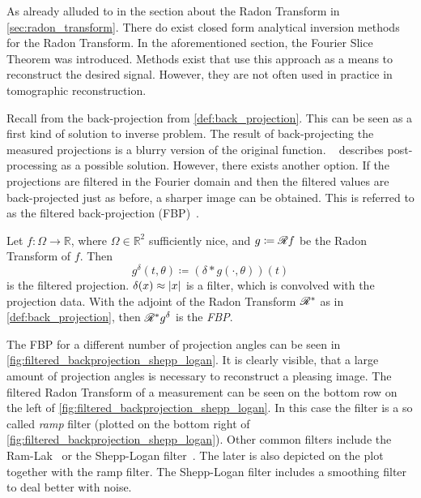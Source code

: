 As already alluded to in the section about the Radon Transform in \autoref{sec:radon_transform}.
There do exist closed form analytical inversion methods for the Radon Transform. In the
aforementioned section, the Fourier Slice Theorem was introduced. Methods exist that use this
approach as a means to reconstruct the desired signal. However, they are not often used in practice
in tomographic reconstruction.

Recall from the back-projection from \autoref{def:back_projection}. This can be seen as a first kind
of solution to inverse problem. The result of back-projecting the measured projections is a blurry
version of the original function. \citeauthor{buzug_computed_2008}~\cite{buzug_computed_2008}
describes post-processing as a possible solution. However, there exists another option. If the
projections are filtered in the Fourier domain and then the filtered values are back-projected just
as before, a sharper image can be obtained. This is referred to as the filtered back-projection
(FBP)~\cite{ramachandran_three-dimensional_1971}.

\begin{definition}\label{def:filtered_back_projection}
	Let \(f\colon \Omega \to \mathbb{R}\), where \(\Omega \in \mathbb{R}^2\) sufficiently nice,
	and \(g \coloneq \mathscr{R} f\) be the Radon Transform of \(f\). Then
	\[ g^\delta(t, \theta) \coloneq (\delta \ast g(\cdot, \theta))(t) \]
	is the filtered projection. \(\delta(x) \approx \lvert x\rvert\) is a filter, which is convolved
	with the projection data. With the adjoint of the Radon Transform \(\mathscr{R}^\ast\) as in
	\autoref{def:back_projection}, then \(\mathscr{R}^\ast g^\delta\) is the \textit{\gls{FBP}}.
\end{definition}

The \gls{FBP} for a different number of projection angles can be seen in
\autoref{fig:filtered_backprojection_shepp_logan}. It is clearly visible, that a large amount of
projection angles is necessary to reconstruct a pleasing image. The filtered Radon Transform of a
measurement can be seen on the bottom row on the left of
\autoref{fig:filtered_backprojection_shepp_logan}. In this case the filter is a so called
\textit{ramp} filter (plotted on the bottom right of
\autoref{fig:filtered_backprojection_shepp_logan}). Other common filters include the
Ram-Lak~\cite{ramachandran_three-dimensional_1971} or the Shepp-Logan
filter~\cite{shepp_fourier_1974}. The later is also depicted on the plot together with the ramp
filter. The Shepp-Logan filter includes a smoothing filter to deal better with noise.

